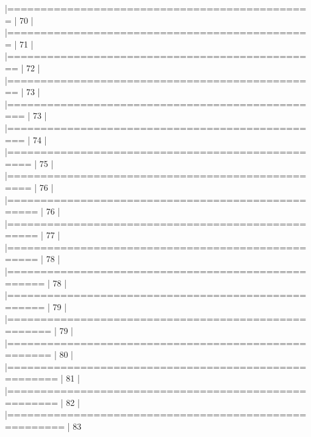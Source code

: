 \documentclass[10pt]{article}
\newenvironment{CodeChunk}{}{}
\begin{document}
\begin{CodeChunk}
\begin{CodeChunk}
\begin{CodeOutput}
  |==============================================                   |  70%
  |                                                                       
  |==============================================                   |  71%
  |                                                                       
  |===============================================                  |  72%
  |                                                                       
  |===============================================                  |  73%
  |                                                                       
  |================================================                 |  73%
  |                                                                       
  |================================================                 |  74%
  |                                                                       
  |=================================================                |  75%
  |                                                                       
  |=================================================                |  76%
  |                                                                       
  |==================================================               |  76%
  |                                                                       
  |==================================================               |  77%
  |                                                                       
  |==================================================               |  78%
  |                                                                       
  |===================================================              |  78%
  |                                                                       
  |===================================================              |  79%
  |                                                                       
  |====================================================             |  79%
  |                                                                       
  |====================================================             |  80%
  |                                                                       
  |=====================================================            |  81%
  |                                                                       
  |=====================================================            |  82%
  |                                                                       
  |======================================================           |  83%

\end{CodeOutput}
\end{CodeChunk}
\end{CodeChunk}
\end{document}
